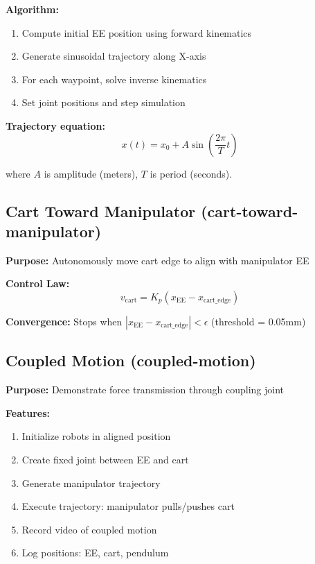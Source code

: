 \documentclass[11pt,a4paper]{article}
\begin{document}
\textbf{Algorithm:}
\begin{enumerate}
    \item Compute initial EE position using forward kinematics
    \item Generate sinusoidal trajectory along X-axis
    \item For each waypoint, solve inverse kinematics
    \item Set joint positions and step simulation
\end{enumerate}

\textbf{Trajectory equation:}
\begin{equation}
x(t) = x_0 + A \sin\left(\frac{2\pi}{T} t\right)
\end{equation}

where $A$ is amplitude (meters), $T$ is period (seconds).

\subsection{Cart Toward Manipulator (cart-toward-manipulator)}

\textbf{Purpose:} Autonomously move cart edge to align with manipulator EE

\textbf{Control Law:}
\begin{equation}
v_{\text{cart}} = K_p (x_{\text{EE}} - x_{\text{cart\_edge}})
\end{equation}

\textbf{Convergence:} Stops when $|x_{\text{EE}} - x_{\text{cart\_edge}}| < \epsilon$ (threshold = 0.05mm)

\subsection{Coupled Motion (coupled-motion)}

\textbf{Purpose:} Demonstrate force transmission through coupling joint

\textbf{Features:}
\begin{enumerate}
    \item Initialize robots in aligned position
    \item Create fixed joint between EE and cart
    \item Generate manipulator trajectory
    \item Execute trajectory: manipulator pulls/pushes cart
    \item Record video of coupled motion
    \item Log positions: EE, cart, pendulum
\end{enumerate}
\end{document}
